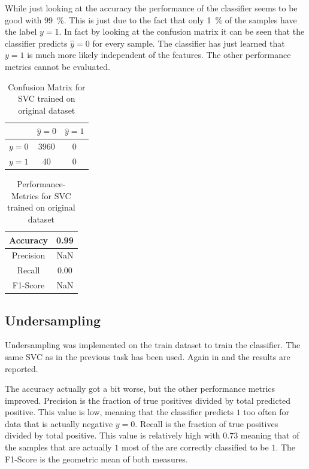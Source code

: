 \documentclass[12pt,a4paper]{scrartcl}
\begin{document}
	While just looking at the accuracy the performance of the classifier seems to be good with \SI{99}{\percent}. This is just due to the fact that only \SI{1}{\percent} of the samples have the label $y=1$.  In fact by looking at the confusion matrix it can be seen that the classifier predicts $\hat{y}=0$ for every sample. The classifier has just learned that $y=1$ is much more likely independent of the features.
	The other performance metrics cannot be evaluated.
	
	\begin{table}[H]
		\centering
		\begin{tabular}{c|c|c|}
			& $\hat{y}=0$ & $\hat{y}=1$ \\ \hline
			$y=0$ & 3960      & 0         \\ \hline
			$y=1$ & 40        & 0         \\ \hline
		\end{tabular}
		\caption{Confusion Matrix for SVC trained on original dataset}
		\label{tab:ex2_3_conf_m1}
	\end{table}
	
	\begin{table}[H]
		\centering
		\begin{tabular}{|c|c|}
			\hline
			Accuracy  & 0.99 \\ \hline
			Precision & NaN \\ \hline
			Recall    & 0.00 \\ \hline
			F1-Score  & NaN \\ \hline
		\end{tabular}
		\caption{Performance-Metrics for SVC trained on original dataset}
		\label{tab:ex2_3_perf1}
	\end{table}
	
	\subsection*{Undersampling}
	Undersampling was implemented on the train dataset to train the classifier. The same SVC as in the previous task has been used. Again in  and  the results are reported.
	
	The accuracy actually got a bit worse, but the other performance metrics improved.
	Precision is the fraction of true positives divided by total predicted positive. This value is low, meaning that the classifier predicts $1$  too often for data that is actually negative $y=0$.
	Recall is the fraction of true positives divided by total positive. This value is relatively high with $0.73$ meaning that of the samples that are actually $1$ most of the are correctly classified to be $1$.
	The F1-Score is the geometric mean of both measures.
		
\end{document}
